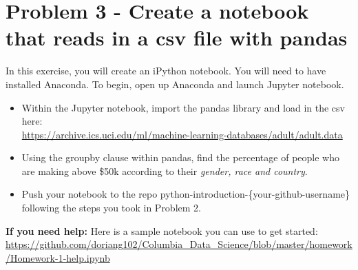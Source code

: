 \documentclass[paper=a4, fontsize=11pt]{scrartcl} %
\numberwithin{equation}{section} %
\numberwithin{figure}{section} %
\numberwithin{table}{section} %
\begin{document}
\section{Problem 3 - Create a notebook that reads in a csv file with pandas}

In this exercise, you will create an iPython notebook. You will need to have installed Anaconda. To begin, open up Anaconda and launch Jupyter notebook.

\begin{itemize}
\item Within the Jupyter notebook, import the pandas library and load in the csv here:\\ \url{https://archive.ics.uci.edu/ml/machine-learning-databases/adult/adult.data}
\item Using the groupby clause within pandas, find the percentage of people who are making above \$50k according to their \emph{gender, race and country}.
\item Push your notebook to the repo python-introduction-\{your-github-username\}  following the steps you took in Problem 2. 
\end{itemize}

\textbf{If you need help:} Here is a sample notebook you can use to get started: \url{https://github.com/doriang102/Columbia_Data_Science/blob/master/homework/Homework-1-help.ipynb}
\end{document}
